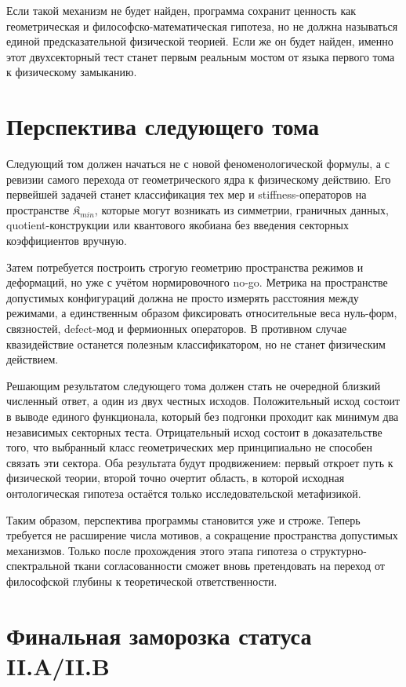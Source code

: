 \documentclass[12pt,a4paper]{article}
\begin{document}
Если такой механизм не будет найден, программа сохранит ценность как геометрическая и философско-математическая гипотеза, но не должна называться единой предсказательной физической теорией. Если же он будет найден, именно этот двухсекторный тест станет первым реальным мостом от языка первого тома к физическому замыканию.

\section{Перспектива следующего тома}

Следующий том должен начаться не с новой феноменологической формулы, а с ревизии самого перехода от геометрического ядра к физическому действию. Его первейшей задачей станет классификация тех мер и stiffness-операторов на пространстве \(\mathfrak{K}_{min}\), которые могут возникать из симметрии, граничных данных, quotient-конструкции или квантового якобиана без введения секторных коэффициентов вручную.

Затем потребуется построить строгую геометрию пространства режимов и деформаций, но уже с учётом нормировочного no-go. Метрика на пространстве допустимых конфигураций должна не просто измерять расстояния между режимами, а единственным образом фиксировать относительные веса нуль-форм, связностей, defect-мод и фермионных операторов. В противном случае квазидействие останется полезным классификатором, но не станет физическим действием.

Решающим результатом следующего тома должен стать не очередной близкий численный ответ, а один из двух честных исходов. Положительный исход состоит в выводе единого функционала, который без подгонки проходит как минимум два независимых секторных теста. Отрицательный исход состоит в доказательстве того, что выбранный класс геометрических мер принципиально не способен связать эти сектора. Оба результата будут продвижением: первый откроет путь к физической теории, второй точно очертит область, в которой исходная онтологическая гипотеза остаётся только исследовательской метафизикой.

Таким образом, перспектива программы становится уже и строже. Теперь требуется не расширение числа мотивов, а сокращение пространства допустимых механизмов. Только после прохождения этого этапа гипотеза о структурно-спектральной ткани согласованности сможет вновь претендовать на переход от философской глубины к теоретической ответственности.

\section{Финальная заморозка статуса II.A/II.B}
\end{document}
